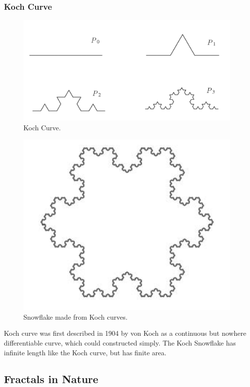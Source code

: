 \subsubsection{Koch Curve}
\begin{figure}[h!]
  \includegraphics[width=\linewidth]{Pictures/koch_curve.png}
  \caption{Koch Curve.}
  \label{fig:cantor_set}
\end{figure}
\begin{figure}[h!]
  \includegraphics[width=\linewidth]{Pictures/snowflake.png}
  \caption{Snowflake made from Koch curves.}
  \label{fig:snowflake}
\end{figure}
Koch curve was first described in 1904 by von Koch as a continuous but nowhere
differentiable curve, which could constructed simply.
The Koch Snowflake has infinite length like the Koch curve, but has finite area.

\subsection{Fractals in Nature}
